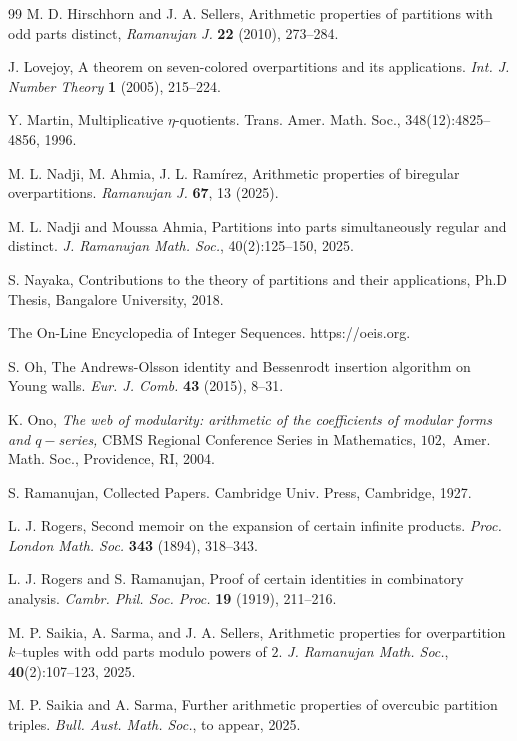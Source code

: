 \documentclass[12pt]{amsart}
\theoremstyle{plain}
\theoremstyle{definition}
\begin{document}
\begin{thebibliography}{99}
 M. D. Hirschhorn and J. A. Sellers, Arithmetic properties of partitions with odd parts distinct,\textit{ Ramanujan J.} \textbf{22} (2010), 273--284.

 J. Lovejoy, A theorem on seven-colored overpartitions and its applications. \textit{Int. J. Number Theory} \textbf{1} (2005), 215--224.

 Y. Martin, Multiplicative $\eta$-quotients. Trans. Amer. Math. Soc., 348(12):4825–4856, 1996.

 M. L. Nadji, M. Ahmia, J. L. Ramírez, Arithmetic properties of biregular overpartitions. \textit{Ramanujan J.} \textbf{67}, 13 (2025).

  M. L. Nadji and Moussa Ahmia, Partitions into parts simultaneously regular and distinct. \textit{J. Ramanujan Math. Soc.}, 40(2):125–150, 2025.

 S. Nayaka, Contributions to the theory of partitions and their applications, Ph.D Thesis, Bangalore University, 2018.

 The On-Line Encyclopedia of Integer Sequences. https://oeis.org.

 S. Oh, The Andrews-Olsson identity and Bessenrodt insertion algorithm on Young walls. \textit{Eur. J. Comb.} \textbf{43 } (2015), 8--31.

 K. Ono, \emph{The web of modularity: arithmetic of the coefficients of modular forms and $q-$series,} CBMS Regional Conference Series in Mathematics, $102,$ Amer. Math. Soc., Providence, RI, 2004.

 S. Ramanujan, Collected Papers. Cambridge Univ. Press, Cambridge, 1927.

 L. J. Rogers, Second memoir on the expansion of certain infinite products. \textit{Proc. London Math. Soc.} \textbf{343} (1894), 318--343.

 L. J. Rogers and S. Ramanujan, Proof of certain identities in combinatory analysis. \textit{Cambr. Phil. Soc. Proc.} \textbf{19} (1919), 211--216.

 M. P. Saikia, A. Sarma, and J. A. Sellers, Arithmetic properties for overpartition $k$–tuples with odd parts modulo powers of $2$. \textit{J. Ramanujan Math. Soc.}, {\bf 40}(2):107–123, 2025.



 M. P. Saikia and A. Sarma, Further arithmetic properties of overcubic partition triples. \textit{Bull. Aust. Math. Soc.}, to appear, 2025.



\end{thebibliography}
\end{document}
